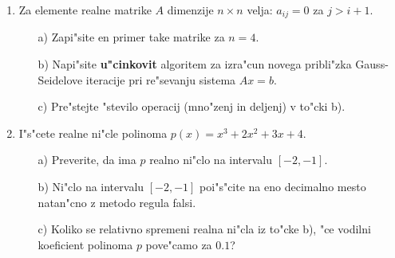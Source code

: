 \documentclass[12pt,a4paper]{article}
\begin{document}
\begin{enumerate}
        \item Za elemente realne matrike $A$ dimenzije $n\times n$ 
          velja: $a_{ij}=0$ za $j>i+1$.
          \begin{itemize}
            \item[a)] Zapi"site en primer take matrike za $n=4$.
            \item[b)] Napi"site {\bf u"cinkovit} algoritem za 
              izra"cun novega pribli"zka Gauss-Seidelove iteracije pri re"sevanju 
	      sistema $A x = b$.
            \item[c)] Pre"stejte "stevilo operacij (mno"zenj in deljenj)
              v to"cki b).
          \end{itemize} 
        \item I"s"cete realne ni"cle polinoma $p(x)=x^3+2x^2+3x+4$.
        \begin{itemize}
                \item[a)] Preverite, da ima $p$ realno ni"clo na
                  intervalu $[-2,-1]$.
                \item[b)] Ni"clo na intervalu $[-2,-1]$ poi"s"cite na
                  eno decimalno mesto na\-tan\-"cno z metodo regula falsi.
                \item[c)] Koliko se relativno spremeni realna ni"cla
                  iz to"cke b), "ce vodilni koeficient polinoma $p$
                  pove"camo za $0.1$?
        \end{itemize} 
\end{enumerate}
\end{document}
